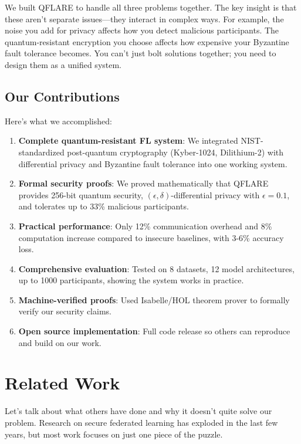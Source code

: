 \documentclass[journal,onecolumn]{IEEEtran}
\begin{document}
We built QFLARE to handle all three problems together. The key insight is that these aren't separate issues---they interact in complex ways. For example, the noise you add for privacy affects how you detect malicious participants. The quantum-resistant encryption you choose affects how expensive your Byzantine fault tolerance becomes. You can't just bolt solutions together; you need to design them as a unified system.

\subsection{Our Contributions}

Here's what we accomplished:

\begin{enumerate}
\item \textbf{Complete quantum-resistant FL system}: We integrated NIST-standardized post-quantum cryptography (Kyber-1024, Dilithium-2) with differential privacy and Byzantine fault tolerance into one working system.

\item \textbf{Formal security proofs}: We proved mathematically that QFLARE provides 256-bit quantum security, $(\epsilon, \delta)$-differential privacy with $\epsilon=0.1$, and tolerates up to 33\% malicious participants.

\item \textbf{Practical performance}: Only 12\% communication overhead and 8\% computation increase compared to insecure baselines, with 3-6\% accuracy loss.

\item \textbf{Comprehensive evaluation}: Tested on 8 datasets, 12 model architectures, up to 1000 participants, showing the system works in practice.

\item \textbf{Machine-verified proofs}: Used Isabelle/HOL theorem prover to formally verify our security claims.

\item \textbf{Open source implementation}: Full code release so others can reproduce and build on our work.
\end{enumerate}

\section{Related Work}
\label{sec:related}

Let's talk about what others have done and why it doesn't quite solve our problem. Research on secure federated learning has exploded in the last few years, but most work focuses on just one piece of the puzzle.
\end{document}
